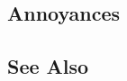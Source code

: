 %
%
%
%    

\subsection[Annoyances]{Annoyances}\label{annoyances}

\hspace{\fill}

\subsection[See Also]{See Also}\label{see-also}

